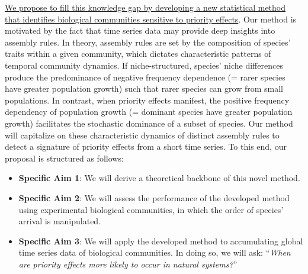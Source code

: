 \documentclass[12pt, class=article, crop=false]{standalone}
\begin{document}
\ul{We propose to fill this knowledge gap by developing a new statistical method that identifies biological communities sensitive to priority effects}.
Our method is motivated by the fact that time series data may provide deep insights into assembly rules.
In theory, assembly rules are set by the composition of species' traits within a given community, which dictates characteristic patterns of temporal community dynamics.
If niche-structured, species' niche differences produce the predominance of negative frequency dependence (= rarer species have greater population growth) such that rarer species can grow from small populations.
In contrast, when priority effects manifest, the positive frequency dependency of population growth (= dominant species have greater population growth) facilitates the stochastic dominance of a subset of species.
Our method will capitalize on these characteristic dynamics of distinct assembly rules to detect a signature of priority effects from a short time series.
To this end, our proposal is structured as follows:

\begin{itemize}
    \item \textbf{Specific Aim 1}: We will derive a theoretical backbone of this novel method.
    \item \textbf{Specific Aim 2}: We will assess the performance of the developed method using experimental biological communities, in which the order of species' arrival is manipulated.
    \item \textbf{Specific Aim 3}: We will apply the developed method to accumulating global time series data of biological communities. In doing so, we will ask: ``\textit{When are priority effects more likely to occur in natural systems?}''
\end{itemize}
\end{document}

